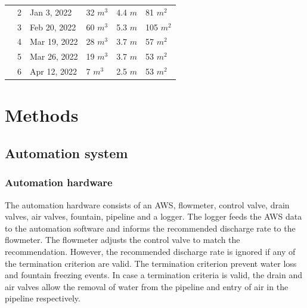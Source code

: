 \documentclass[tc, manuscript]{copernicus}
\begin{document}
\begin{table}
\begin{tabular}{@{}|llllll|@{}}
		\multicolumn{1}{|l|}{} & 2            & Jan 3, 2022   & 32 $m^{3}$      & 4.4 $m$
		                       & 81 $m^{2}$                                                                       \\
		\multicolumn{1}{|l|}{} & 3            & Feb 20, 2022   & 60 $m^{3}$      & 5.3 $m$
		                       & 105 $m^{2}$                                                                       \\
		\multicolumn{1}{|l|}{} & 4            & Mar 19, 2022   & 28 $m^{3}$      & 3.7 $m$
		                       & 57 $m^{2}$                                                                       \\
		\multicolumn{1}{|l|}{} & 5            & Mar 26, 2022   & 19 $m^{3}$      & 3.7 $m$
		                       & 53 $m^{2}$                                                                       \\
		\multicolumn{1}{|l|}{} & 6            & Apr 12, 2022   & 7 $m^{3}$      & 2.5 $m$
		                       & 53 $m^{2}$                                                                       \\
		\bottomrule
	\end{tabular}

\end{table}

\section{Methods}

\subsection{Automation system}

\subsubsection{Automation hardware}

The automation hardware consists of an AWS, flowmeter, control valve, drain valves, air valves, fountain,
pipeline and a logger. The logger feeds the AWS data to the automation software and informs the recommended
discharge rate to the flowmeter. The flowmeter adjusts the control valve to match the recommendation. However,
the recommended discharge rate is ignored if any of the termination criterion are valid. The termination
criterion prevent water loss and fountain freezing events. In case a termination criteria is valid, the drain
and air valves allow the removal of water from the pipeline and entry of air in the pipeline respectively.
\end{document}
